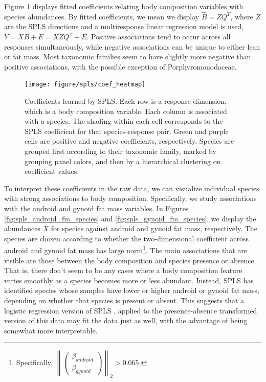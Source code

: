 \documentclass{article}
\begin{document}
Figure \ref{fig:spls_coef_heatmap} displays fitted coefficients relating body
composition variables with species abundances. By fitted coefficients, we mean
we display $\hat{B} = ZQ^T$, where $Z$ are the SPLS directions and a
multiresponse linear regression model is used, $Y = XB + E = XZQ^T + E$.
Positive associations tend to occur across all responses simultaneously, while
negative associations can be unique to either lean or fat mass. Most taxonomic
families seem to have slightly more negative than positive associations, with
the possible exception of Porphyromonodaceae.

\begin{figure}
  \centering
  \texttt{[image: figure/spls/coef\_heatmap]}
  \caption{
    Coefficients learned by SPLS. Each row is a response dimension, which is a
    body composition variable. Each column is associated with a species. The
    shading within each cell corresponds to the SPLS coefficient for that
    species-response pair. Green and purple cells are positive and negative
    coefficients, respectively. Species are grouped first according to their
    taxonomic family, marked by grouping panel colors, and then by a
    hierarchical clustering on coefficient values.
    \label{fig:spls_coef_heatmap} }
\end{figure}

To interpret these coefficients in the raw data, we can visualize individual
species with strong associations to body composition. Specifically, we study
associations with the android and gynoid fat mass variables. In Figures
\ref{fig:spls_android_fm_species} and \ref{fig:spls_gynoid_fm_species}, we
display the abundances $X$ for species against android and gynoid fat mass,
respectively. The species are chosen according to whether the two-dimensional
coefficient across android and gynoid fat mass has large
norm\footnote{Specifically, $\left\| \begin{pmatrix} \beta_{android}
    \\ \beta_{gynoid} \end{pmatrix} \right\|_{2} > 0.065$.}. The main
associations that are visible are those between the body composition and species
presence or absence. That is, there don't seem to be any cases where a body
composition feature varies smoothly as a species becomes more or less abundant.
Instead, SPLS has identified species whose samples have lower or higher android
or gynoid fat mass, depending on whether that species is present or absent. This
suggests that a logistic regression version of SPLS \citep{chung2010sparse},
applied to the presence-absence transformed version of this data may fit the
data just as well, with the advantage of being somewhat more interpretable.
\end{document}
